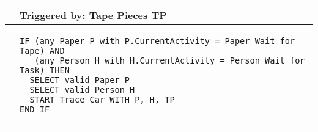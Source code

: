 \begin{longtable}{@{}>{\raggedright\arraybackslash}p{0.25cm}>{\raggedright\arraybackslash}p{13cm}@{}}
  \toprule
   & Triggered by: Tape Pieces TP\\ \midrule 
  &
\begin{lstlisting}[language=CMPseudo]
IF (any Paper P with P.CurrentActivity = Paper Wait for Tape) AND
   (any Person H with H.CurrentActivity = Person Wait for Task) THEN
  SELECT valid Paper P
  SELECT valid Person H
  START Trace Car WITH P, H, TP
END IF
\end{lstlisting}
  \\ \bottomrule
  \end{longtable}